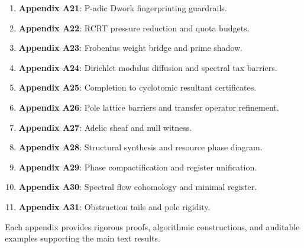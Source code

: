 \begin{enumerate}
  \item \textbf{Appendix A21}: P-adic Dwork fingerprinting guardrails.
  \item \textbf{Appendix A22}: RCRT pressure reduction and quota budgets.
  \item \textbf{Appendix A23}: Frobenius weight bridge and prime shadow.
  \item \textbf{Appendix A24}: Dirichlet modulus diffusion and spectral tax barriers.
  \item \textbf{Appendix A25}: Completion to cyclotomic resultant certificates.
  \item \textbf{Appendix A26}: Pole lattice barriers and transfer operator refinement.
  \item \textbf{Appendix A27}: Adelic sheaf and null witness.
  \item \textbf{Appendix A28}: Structural synthesis and resource phase diagram.
  \item \textbf{Appendix A29}: Phase compactification and register unification.
  \item \textbf{Appendix A30}: Spectral flow cohomology and minimal register.
  \item \textbf{Appendix A31}: Obstruction tails and pole rigidity.
\end{enumerate}

Each appendix provides rigorous proofs, algorithmic constructions, and auditable examples supporting the main text results.
